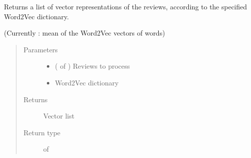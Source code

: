 \documentclass[letterpaper,10pt,english]{sphinxmanual}
\begin{document}
\begin{fulllineitems}
\label{\detokenize{learning:loacore.learning.word_embeddings.reviews_2_vec}}
Returns a list of vector representations of the reviews, according to the specified Word2Vec dictionary.

(Currently : mean of the Word2Vec vectors of words)
\begin{quote}\begin{description}
\item[{Parameters}] \leavevmode\begin{itemize}
\item {} 
 ( of {\hyperref[\detokenize{classes:loacore.classes.classes.Review}]{}}) \textendash{} Reviews to process

\item {} 
 \textendash{} Word2Vec dictionary

\end{itemize}

\item[{Returns}] \leavevmode
Vector list

\item[{Return type}] \leavevmode

 of 


\end{description}\end{quote}

\end{fulllineitems}

\end{document}
